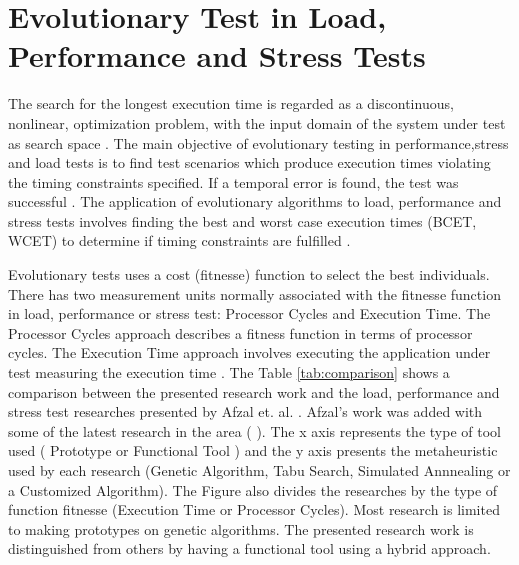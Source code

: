 \section{Evolutionary Test in Load, Performance and Stress Tests}

The search for the longest execution time is regarded as a discontinuous, nonlinear, optimization problem, with the input domain of the system under test as search space \cite{Sullivan}. The main objective of evolutionary testing in performance,stress and load tests is to find test scenarios which produce execution times violating the timing constraints specified. If a temporal error is found, the test was successful \cite{Sullivan}. The application of evolutionary algorithms to load, performance and stress tests involves finding the best and worst case execution times (BCET, WCET) to determine if timing constraints are fulfilled \cite{Afzal2009a}. 

Evolutionary tests uses a cost (fitnesse) function to select the best individuals. There has two measurement units normally associated with the fitnesse function in load, performance or stress test: Processor Cycles and Execution Time. The Processor Cycles approach describes a fitness function in terms of processor cycles. The Execution Time approach involves executing the application under test measuring the execution time \cite{Afzal2009} \cite{tracey2000search}.
%
%
The Table \ref{tab:comparison}  shows a comparison between the presented research work and the load, performance and stress test researches presented by Afzal et. al. \cite{Afzal2009}. Afzal's work was added with some of the latest research in the area (\cite{Garousi2006} \cite{Garousi2010}). The x axis represents the type of tool used ( Prototype or Functional Tool )  and the y axis presents the metaheuristic used by each research (Genetic Algorithm, Tabu Search, Simulated Annnealing or a Customized Algorithm). The Figure also divides the researches by the type of function fitnesse (Execution Time or Processor Cycles). Most research is limited to making prototypes on genetic algorithms. The presented research work is distinguished from others by having a functional tool using a hybrid approach. 

%
%



